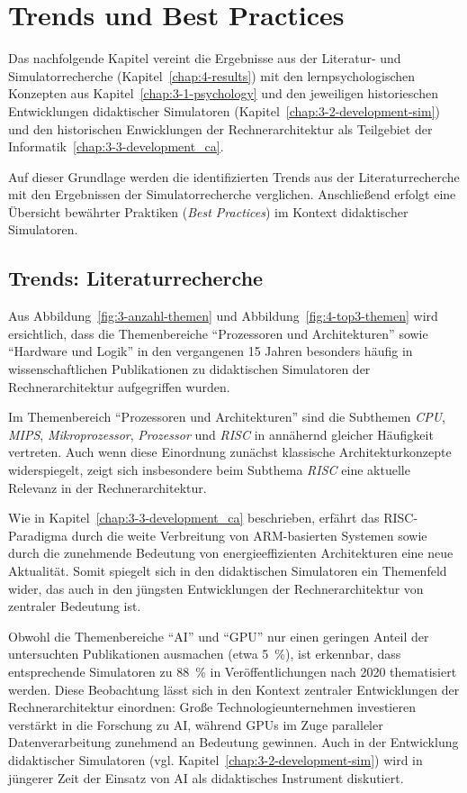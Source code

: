 \section{Trends und Best Practices}

Das nachfolgende Kapitel vereint die Ergebnisse aus der Literatur- und Simulatorrecherche (Kapitel~\ref{chap:4-results}) mit den lernpsychologischen Konzepten aus Kapitel~\ref{chap:3-1-psychology} und den jeweiligen historieschen Entwicklungen didaktischer Simulatoren (Kapitel~\ref{chap:3-2-development-sim}) und den historischen Enwicklungen der Rechnerarchitektur als Teilgebiet der Informatik~\ref{chap:3-3-development_ca}.

Auf dieser Grundlage werden die identifizierten Trends aus der Literaturrecherche mit den Ergebnissen der Simulatorrecherche verglichen. Anschließend erfolgt eine Übersicht bewährter Praktiken (\textit{Best Practices}) im Kontext didaktischer Simulatoren.

\subsection{Trends: Literaturrecherche}

Aus Abbildung~\ref{fig:3-anzahl-themen} und Abbildung~\ref{fig:4-top3-themen} wird ersichtlich, dass die Themenbereiche \enquote{Prozessoren und Architekturen} sowie \enquote{Hardware und Logik} in den vergangenen 15 Jahren besonders häufig in wissenschaftlichen Publikationen zu didaktischen Simulatoren der Rechnerarchitektur aufgegriffen wurden.  

Im Themenbereich \enquote{Prozessoren und Architekturen} sind die Subthemen \textit{CPU}, \textit{MIPS}, \textit{Mikroprozessor}, \textit{Prozessor} und \textit{RISC} in annähernd gleicher Häufigkeit vertreten. Auch wenn diese Einordnung zunächst klassische Architekturkonzepte widerspiegelt, zeigt sich insbesondere beim Subthema \textit{RISC} eine aktuelle Relevanz in der Rechnerarchitektur.  

Wie in Kapitel~\ref{chap:3-3-development_ca} beschrieben, erfährt das \ac{RISC}-Paradigma durch die weite Verbreitung von ARM-basierten Systemen sowie durch die zunehmende Bedeutung von energieeffizienten Architekturen eine neue Aktualität. Somit spiegelt sich in den didaktischen Simulatoren ein Themenfeld wider, das auch in den jüngsten Entwicklungen der Rechnerarchitektur von zentraler Bedeutung ist.

Obwohl die Themenbereiche \enquote{AI} und \enquote{GPU} nur einen geringen Anteil der untersuchten Publikationen ausmachen (etwa 5~\%), ist erkennbar, dass entsprechende Simulatoren zu 88~\% in Veröffentlichungen nach 2020 thematisiert werden. Diese Beobachtung lässt sich in den Kontext zentraler Entwicklungen der Rechnerarchitektur einordnen: Große Technologieunternehmen investieren verstärkt in die Forschung zu \ac{AI}, während GPUs im Zuge paralleler Datenverarbeitung zunehmend an Bedeutung gewinnen. Auch in der Entwicklung didaktischer Simulatoren (vgl. Kapitel~\ref{chap:3-2-development-sim}) wird in jüngerer Zeit der Einsatz von \ac{AI} als didaktisches Instrument diskutiert.

